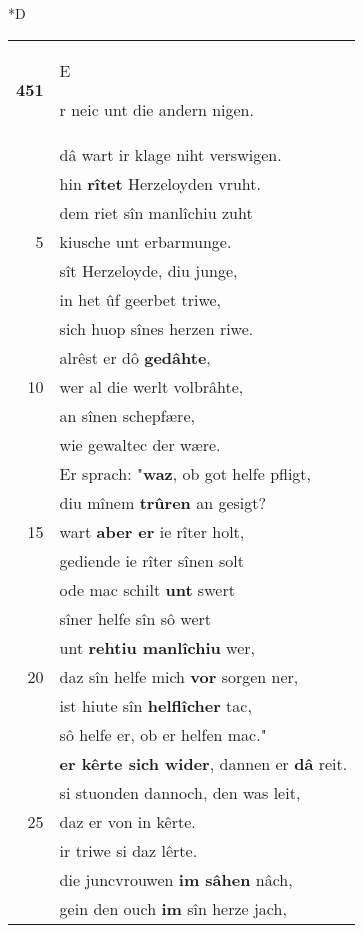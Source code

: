 \documentclass[8pt,a4paper,notitlepage]{article}
\begin{document}
\begin{table}[ht]
\begin{minipage}[t]{0.5\linewidth}
\small
\begin{center}*D
\end{center}
\begin{tabular}{rl}
\textbf{451} & \begin{large}E\end{large}r neic unt die andern nigen.\\ 
 & dâ wart ir klage niht verswigen.\\ 
 & hin \textbf{rîtet} Herzeloyden vruht.\\ 
 & dem riet sîn manlîchiu zuht\\ 
5 & kiusche unt erbarmunge.\\ 
 & sît Herzeloyde, diu junge,\\ 
 & in het ûf geerbet triwe,\\ 
 & sich huop sînes herzen riwe.\\ 
 & alrêst er dô \textbf{gedâhte},\\ 
10 & wer al die werlt volbrâhte,\\ 
 & an sînen schepfære,\\ 
 & wie gewaltec der wære.\\ 
 & Er sprach: "\textbf{waz}, ob got helfe pfligt,\\ 
 & diu mînem \textbf{trûren} an gesigt?\\ 
15 & wart \textbf{aber er} ie rîter holt,\\ 
 & gediende ie rîter sînen solt\\ 
 & ode mac schilt \textbf{unt} swert\\ 
 & sîner helfe sîn sô wert\\ 
 & unt \textbf{rehtiu manlîchiu} wer,\\ 
20 & daz sîn helfe mich \textbf{vor} sorgen ner,\\ 
 & ist hiute sîn \textbf{helflîcher} tac,\\ 
 & sô helfe er, ob er helfen mac."\\ 
 & \textbf{er kêrte sich wider}, dannen er \textbf{dâ} reit.\\ 
 & si stuonden dannoch, den was leit,\\ 
25 & daz er von in kêrte.\\ 
 & ir triwe si daz lêrte.\\ 
 & die juncvrouwen \textbf{im sâhen} nâch,\\ 
 & gein den ouch \textbf{im} sîn herze jach,\\ 

\end{tabular}
\end{minipage}
\end{table}
\end{document}
